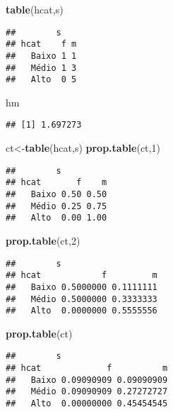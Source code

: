 \documentclass[]{article}
\newenvironment{Shaded}{\begin{snugshade}}{\end{snugshade}}
\newcommand{\KeywordTok}[1]{\textcolor[rgb]{0.13,0.29,0.53}{\textbf{#1}}}
\newcommand{\DecValTok}[1]{\textcolor[rgb]{0.00,0.00,0.81}{#1}}
\newcommand{\NormalTok}[1]{#1}
\begin{document}
\begin{Shaded}
\begin{Highlighting}[]
\KeywordTok{table}\NormalTok{(hcat,s)}
\end{Highlighting}
\end{Shaded}

\begin{verbatim}
##        s
## hcat    f m
##   Baixo 1 1
##   Médio 1 3
##   Alto  0 5
\end{verbatim}

\begin{Shaded}
\begin{Highlighting}[]
\NormalTok{hm}
\end{Highlighting}
\end{Shaded}

\begin{verbatim}
## [1] 1.697273
\end{verbatim}

\begin{Shaded}
\begin{Highlighting}[]
\NormalTok{ct<-}\KeywordTok{table}\NormalTok{(hcat,s)}
\KeywordTok{prop.table}\NormalTok{(ct,}\DecValTok{1}\NormalTok{)}
\end{Highlighting}
\end{Shaded}

\begin{verbatim}
##        s
## hcat       f    m
##   Baixo 0.50 0.50
##   Médio 0.25 0.75
##   Alto  0.00 1.00
\end{verbatim}

\begin{Shaded}
\begin{Highlighting}[]
\KeywordTok{prop.table}\NormalTok{(ct,}\DecValTok{2}\NormalTok{)}
\end{Highlighting}
\end{Shaded}

\begin{verbatim}
##        s
## hcat            f         m
##   Baixo 0.5000000 0.1111111
##   Médio 0.5000000 0.3333333
##   Alto  0.0000000 0.5555556
\end{verbatim}

\begin{Shaded}
\begin{Highlighting}[]
\KeywordTok{prop.table}\NormalTok{(ct)}
\end{Highlighting}
\end{Shaded}

\begin{verbatim}
##        s
## hcat             f          m
##   Baixo 0.09090909 0.09090909
##   Médio 0.09090909 0.27272727
##   Alto  0.00000000 0.45454545
\end{verbatim}
\end{document}
